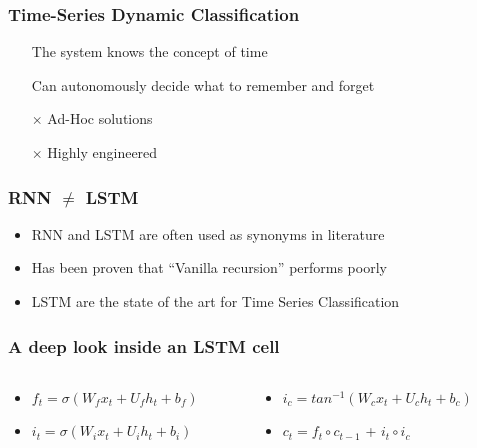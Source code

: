 \documentclass{beamer}
\begin{document}
\begin{frame}
    \frametitle{Time-Series Dynamic Classification}
    \begin{itemize}
        \item[\checkmark] The system knows the concept of time
        \item[\checkmark] Can autonomously decide what to remember and forget
        \item[$\times$] Ad-Hoc solutions
        \item[$\times$] Highly engineered
    \end{itemize}
\end{frame}

\begin{frame}
    \frametitle{RNN $\ne$ LSTM}
    \vspace{0.3cm}
    \begin{itemize}
        \item RNN and LSTM are often used as synonyms in literature 
        \item Has been proven that ``Vanilla recursion'' performs poorly  
        \item LSTM are the state of the art for Time Series Classification 
    \end{itemize}
    
\end{frame}

\begin{frame}
    \frametitle{A deep look inside an LSTM cell}
     \pause
    \begin{columns}
        \begin{column}{0.5\textwidth}
            \begin{itemize}
                \item $f_t = \sigma(W_f x_t + U_f h_t + b_f)$ \pause
                \item $i_t = \sigma(W_i x_t + U_i h_t + b_i)$ \pause
            \end{itemize}
        \end{column}
        \begin{column}{0.5\textwidth}
            \begin{itemize}
                \item $i_c = tan^{-1}(W_c x_t + U_c h_t + b_c)$ \pause
                \item $c_t = f_t \circ c_{t-1}$ \pause + $i_t \circ i_c$
            \end{itemize}
        \end{column}
    \end{columns}
\end{frame}
\end{document}
